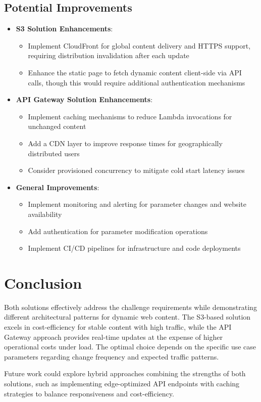 \documentclass{article}
\begin{document}
\subsection{Potential Improvements}

\begin{itemize}
    \item \textbf{S3 Solution Enhancements}:
    \begin{itemize}
        \item Implement CloudFront for global content delivery and HTTPS support, requiring distribution invalidation after each update
        \item Enhance the static page to fetch dynamic content client-side via API calls, though this would require additional authentication mechanisms
    \end{itemize}
    
    \item \textbf{API Gateway Solution Enhancements}:
    \begin{itemize}
        \item Implement caching mechanisms to reduce Lambda invocations for unchanged content
        \item Add a CDN layer to improve response times for geographically distributed users
        \item Consider provisioned concurrency to mitigate cold start latency issues
    \end{itemize}
    
    \item \textbf{General Improvements}:
    \begin{itemize}
        \item Implement monitoring and alerting for parameter changes and website availability
        \item Add authentication for parameter modification operations
        \item Implement CI/CD pipelines for infrastructure and code deployments
    \end{itemize}
\end{itemize}

\section{Conclusion}

Both solutions effectively address the challenge requirements while demonstrating different architectural patterns for dynamic web content. The S3-based solution excels in cost-efficiency for stable content with high traffic, while the API Gateway approach provides real-time updates at the expense of higher operational costs under load. The optimal choice depends on the specific use case parameters regarding change frequency and expected traffic patterns.

Future work could explore hybrid approaches combining the strengths of both solutions, such as implementing edge-optimized API endpoints with caching strategies to balance responsiveness and cost-efficiency.
\end{document}
